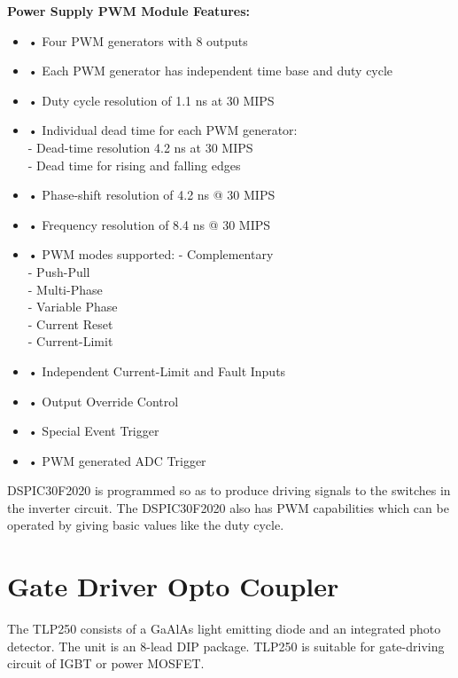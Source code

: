 \documentclass[12pt,a4paper]{report}
\begin{document}
 \vspace{0.7cm}
{\bf Power Supply PWM Module Features:}
 \begin{itemize}
 	
 	\item • Four PWM generators with 8 outputs
 	\item • Each PWM generator has independent time base
 	and duty cycle
 	\item • Duty cycle resolution of 1.1 ns at 30 MIPS
 	\item • Individual dead time for each PWM generator:\\
 	- Dead-time resolution 4.2 ns at 30 MIPS\\
 	- Dead time for rising and falling edges
 	\item • Phase-shift resolution of 4.2 ns @ 30 MIPS
 	\item • Frequency resolution of 8.4 ns @ 30 MIPS
 	\item • PWM modes supported:
 	- Complementary\\
 	- Push-Pull\\
 	- Multi-Phase\\
 	- Variable Phase\\
 	- Current Reset\\
 	- Current-Limit
 	\item • Independent Current-Limit and Fault Inputs
 	\item • Output Override Control
 	\item • Special Event Trigger
 	\item • PWM generated ADC Trigger
 \end{itemize}

DSPIC30F2020 is programmed so as to produce driving signals to the switches in the inverter circuit. The DSPIC30F2020 also has PWM capabilities which can be operated by giving basic values like the duty cycle.

\section{Gate Driver Opto Coupler}
The TLP250 consists of a GaAlAs light emitting diode and an integrated photo detector. The unit is an 8-lead DIP package. TLP250 is suitable for gate-driving circuit of IGBT or power MOSFET. \\
\end{document}
